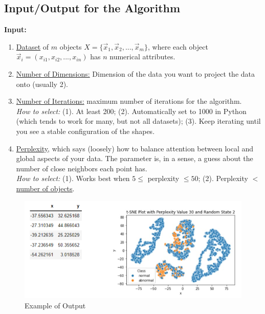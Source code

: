 \documentclass[11pt]{elegantbook}
\begin{document}
\subsection{Input/Output for the Algorithm}
\textbf{Input:}
\begin{enumerate}[$\bullet$]
    \item \underline{Dataset} of $m$ objects $X=\{\vec{x}_1,\vec{x}_2,...,\vec{x}_m\}$, where each object $\vec{x}_i=(x_{i1},x_{i2},...,x_{in})$ has $n$ numerical attributes.
    \item \underline{Number of Dimensions:} Dimension of the data you want to project the data onto (usually 2).
    \item \underline{Number of Iterations:} maximum number of iterations for the algorithm.\\
    \textit{How to select:} (1). At least 200; (2). Automatically set to 1000 in Python (which tends to work for many, but not all datasets); (3). Keep iterating until you see a stable configuration of the shapes.
    \item \underline{Perplexity}, which says (loosely) how to balance attention between local and global aspects of your data. The parameter is, in a sense, a guess about the number of close neighbors each point has.\\
    \textit{How to select:} (1). Works best when $5 \leq$ perplexity $\leq 50$; (2). Perplexity $<$ \underline{number of objects}.
\end{enumerate}
\begin{center}\begin{figure}[htbp]
    \centering
    \includegraphics[scale=0.5]{tsne_example_of_output.png}
    \caption{Example of Output}
    \label{}
\end{figure}\end{center}
\end{document}
